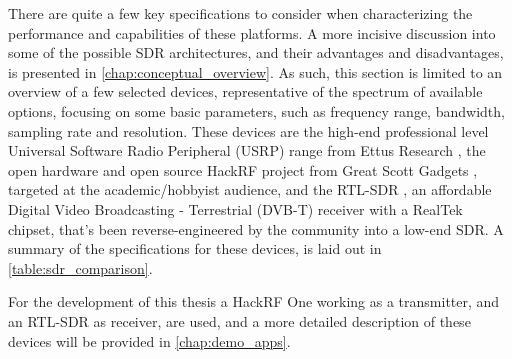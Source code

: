 There are quite a few key specifications to consider when characterizing the performance and capabilities of these platforms. A more incisive discussion into some of the possible SDR architectures, and their advantages and disadvantages, is presented in \autoref{chap:conceptual_overview}. As such, this section is limited to an overview of a few selected devices, representative of the spectrum of available options, focusing on some basic parameters, such as frequency range, bandwidth, sampling rate and resolution. These devices are the high-end professional level Universal Software Radio Peripheral (USRP) range from Ettus Research \cite{usrp_product_selector}, the open hardware and open source HackRF project from Great Scott Gadgets \cite{hackrf_one_product}, targeted at the academic/hobbyist audience, and the RTL-SDR \cite{rtlsdr_product}, an affordable Digital Video Broadcasting - Terrestrial (DVB-T) receiver with a RealTek chipset, that's been reverse-engineered by the community into a low-end SDR. A summary of the specifications for these devices, is laid out in \autoref{table:sdr_comparison}.

For the development of this thesis a HackRF One working as a transmitter, and an RTL-SDR as receiver, are used, and a more detailed description of these devices will be provided in \autoref{chap:demo_apps}.

